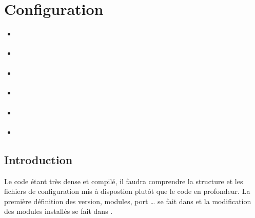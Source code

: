 \documentclass[letterpaper,10pt,french]{sphinxmanual}
\begin{document}
\section{Configuration}
\label{\detokenize{doc_instal/configuration:configuration}}\label{\detokenize{doc_instal/configuration::doc}}
\begin{sphinxShadowBox}
\begin{itemize}
\item {} 
\sphinxAtStartPar
{}\label{\detokenize{doc_instal/configuration:id1}}{\hyperref[\detokenize{doc_instal/configuration:introduction}]{}}

\item {} 
\sphinxAtStartPar
{}\label{\detokenize{doc_instal/configuration:id2}}{\hyperref[\detokenize{doc_instal/configuration:localisation-des-differents-repertoires}]{}}

\item {} 
\sphinxAtStartPar
{}\label{\detokenize{doc_instal/configuration:id3}}{\hyperref[\detokenize{doc_instal/configuration:fichiers-de-configuration-du-datadir}]{}}

\item {} 
\sphinxAtStartPar
{}\label{\detokenize{doc_instal/configuration:id4}}{\hyperref[\detokenize{doc_instal/configuration:versionnement-des-modules}]{}}

\item {} 
\sphinxAtStartPar
{}\label{\detokenize{doc_instal/configuration:id5}}{\hyperref[\detokenize{doc_instal/configuration:base-de-donnee}]{}}

\item {} 
\sphinxAtStartPar
{}\label{\detokenize{doc_instal/configuration:id6}}{\hyperref[\detokenize{doc_instal/configuration:scripts-de-personnalisation}]{}}

\end{itemize}
\end{sphinxShadowBox}


\subsection{Introduction}
\label{\detokenize{doc_instal/configuration:introduction}}
\sphinxAtStartPar
Le code étant très dense et compilé, il faudra comprendre la structure et les fichiers de configuration mis à dispostion plutôt que le code en profondeur.
La première définition des version, modules, port … se fait dans  et la modification des modules installés se fait dans
.
\end{document}
